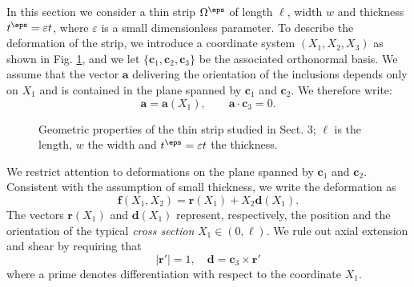 \documentclass[oneside]{article}
\begin{document}
			In this section we consider a thin strip $\Omega^\eps$ of length $\ell$, width $w$ and thickness $t^{\eps}=\varepsilon {t}$, where $\varepsilon$ is a small dimensionless parameter. To describe the deformation of the strip, we introduce a coordinate system $(X_1,X_2,X_3)$ as shown in Fig. \ref{fig:strips}, and we let $\{\bm c_1, \bm c_2, \bm c_3\}$ be the associated orthonormal basis. We assume that the vector $\bm a$ delivering the orientation of the inclusions depends only on $X_1$ and is contained in the plane spanned by $\bm c_1$ and $\bm c_2$. We therefore write:
			\begin{equation}
			\bm a=\bm a(X_1),\qquad \bm a\cdot\bm c_3=0.
			\end{equation}
			\begin{figure}
				\begin{center}
					\begin{footnotesize}
						\def\svgwidth{.60\textwidth}
						
					\end{footnotesize}\vspace{-0.7cm}
				\end{center}
				\caption{Geometric properties of the thin strip studied in Sect. 3; $\ell$ is the length, $w$ the width and $t^{\eps}=\varepsilon t$ the thickness.\vspace{-0.7cm}}
				\label{fig:strips}
			\end{figure}
			We restrict attention to deformations on the plane spanned by $\bm c_1$ and $\bm c_2$. Consistent with the assumption of small thickness, we write the deformation as
			\begin{equation}\label{defrod}
			\bm f(X_1,X_2)=\bm r(X_1)+X_2\bm d(X_1).
			\end{equation}
			The vectors $\bm r(X_1)$ and $\bm d(X_1)$ represent, respectively, the position and the orientation of the typical \emph{cross section} $X_1\in (0,\ell)$. We rule out axial extension and shear by requiring that
			\begin{equation}
			|\bm r'|=1, \quad \bm d=\bm c_3\times\bm r'
			\end{equation}
			where a prime denotes differentiation with respect to the coordinate $X_1$.  
			
\end{document}
